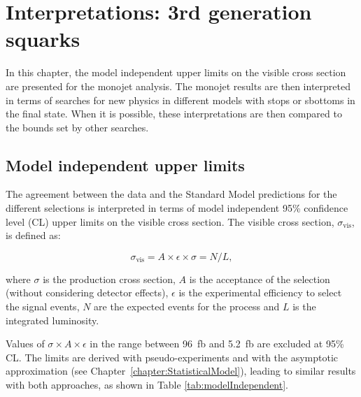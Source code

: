 \chapter{Interpretations: 3rd generation squarks}
    \label{chapter:Interpretations}

In this chapter, the model independent upper limits on the visible cross section are presented for the monojet analysis.
The monojet results are then interpreted in terms of searches for new physics in different models with stops or sbottoms in the final state.
When it is possible, these interpretations are then compared to the bounds set by other searches.


\section{Model independent upper limits}
    \label{sec:ModelIndependentLimits}

The agreement between the data and the Standard Model predictions for the different selections is interpreted in terms of model independent 95\% confidence level (CL) upper limits on the visible cross section.
The visible cross section, $\sigma_{\text{vis}}$, is defined as:

\begin{equation}
\sigma_{\text{vis}} = A\times\epsilon\times\sigma = N / L,
\label{eq:visibleXSec}
\end{equation}

\noindent where $\sigma$ is the production cross section, $A$ is the acceptance of the selection (without considering detector effects), $\epsilon$ is the experimental efficiency to select the signal events, $N$ are the expected events for the process and $L$ is the integrated luminosity.
    
Values of $\sigma \times A \times \epsilon$ in the range between 96~fb and 5.2~fb are excluded at 95\% CL.
The limits are derived with pseudo-experiments and with the asymptotic approximation (see Chapter~\ref{chapter:StatisticalModel}), leading to similar results with both approaches, as shown in Table \ref{tab:modelIndependent}.

